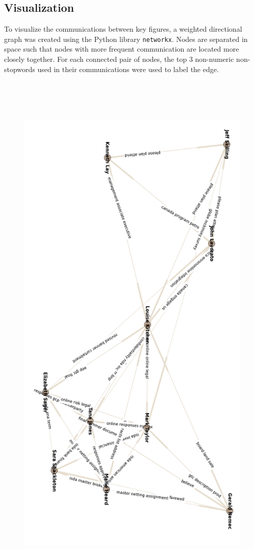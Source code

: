 \documentclass{article}
\begin{document}
\subsection{Visualization}
To visualize the communications between key figures, a weighted directional graph was created using the Python library \texttt{networkx}. Nodes are separated in space such that nodes with more frequent communication are located more closely together. For each connected pair of nodes, the top 3 non-numeric non-stopwords used in their communications were used to label the edge. 

\begin{figure}[ht!]
\centering
\includegraphics[height=260mm]{graph.png}
\end{figure}
\end{document}
